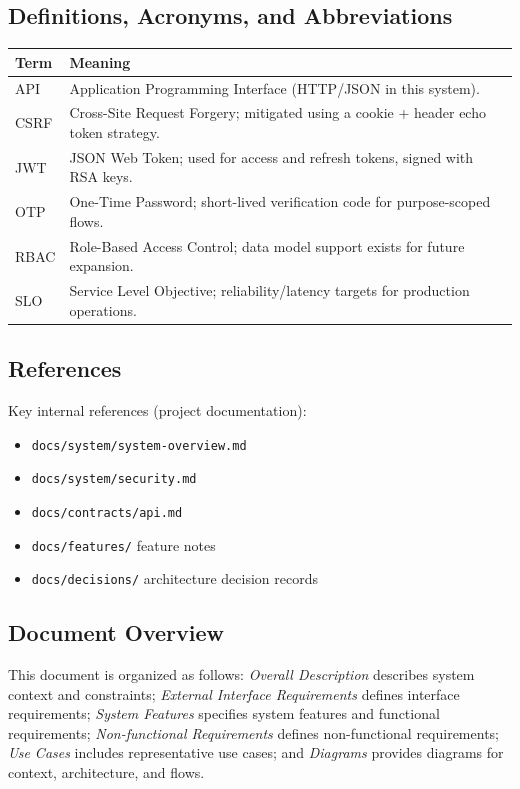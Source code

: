 \documentclass[11pt]{article}
\begin{document}
    \subsection{Definitions, Acronyms, and Abbreviations}
    \begin{tabularx}{\textwidth}{@{}lX@{}}
\toprule
\textbf{Term} & \textbf{Meaning} \\
\midrule
API & Application Programming Interface (HTTP/JSON in this system). \\
CSRF & Cross-Site Request Forgery; mitigated using a cookie + header echo token strategy. \\
JWT & JSON Web Token; used for access and refresh tokens, signed with RSA keys. \\
OTP & One-Time Password; short-lived verification code for purpose-scoped flows. \\
RBAC & Role-Based Access Control; data model support exists for future expansion. \\
SLO & Service Level Objective; reliability/latency targets for production operations. \\
\bottomrule
    \end{tabularx}

    \subsection{References}
    Key internal references (project documentation):
    \begin{itemize}
        \item \texttt{docs/system/system-overview.md}
        \item \texttt{docs/system/security.md}
        \item \texttt{docs/contracts/api.md}
        \item \texttt{docs/features/} feature notes
        \item \texttt{docs/decisions/} architecture decision records
    \end{itemize}

    \subsection{Document Overview}
    This document is organized as follows: \emph{Overall Description} describes system context and constraints; \emph{External Interface Requirements} defines interface requirements; \emph{System Features} specifies system features and functional requirements; \emph{Non-functional Requirements} defines non-functional requirements; \emph{Use Cases} includes representative use cases; and \emph{Diagrams} provides diagrams for context, architecture, and flows.
\end{document}
